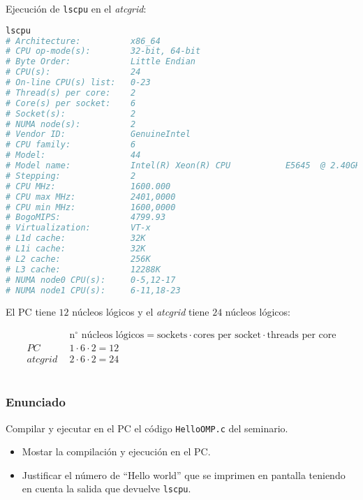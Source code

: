 \pagebreak

Ejecución de \texttt{lscpu} en el \textit{atcgrid}:

\begin{lstlisting}[language=sh]
lscpu
# Architecture:          x86_64
# CPU op-mode(s):        32-bit, 64-bit
# Byte Order:            Little Endian
# CPU(s):                24
# On-line CPU(s) list:   0-23
# Thread(s) per core:    2
# Core(s) per socket:    6
# Socket(s):             2
# NUMA node(s):          2
# Vendor ID:             GenuineIntel
# CPU family:            6
# Model:                 44
# Model name:            Intel(R) Xeon(R) CPU           E5645  @ 2.40GHz
# Stepping:              2
# CPU MHz:               1600.000
# CPU max MHz:           2401,0000
# CPU min MHz:           1600,0000
# BogoMIPS:              4799.93
# Virtualization:        VT-x
# L1d cache:             32K
# L1i cache:             32K
# L2 cache:              256K
# L3 cache:              12288K
# NUMA node0 CPU(s):     0-5,12-17
# NUMA node1 CPU(s):     6-11,18-23
\end{lstlisting}

El PC tiene $12$ núcleos lógicos y el \textit{atcgrid} tiene $24$ núcleos lógicos:

\[\begin{split}
           & \text{n$^\circ$ núcleos lógicos}=\text{sockets}\cdot\text{cores per socket}\cdot\text{threads per core}\\
PC\ \      & 1\cdot6\cdot2=12 \\
\textit{atcgrid}\ \ & 2\cdot6\cdot2=24
\end{split}\]

\section{}\label{ej1-2}

\subsubsection{Enunciado}

Compilar y ejecutar en el PC el código \texttt{HelloOMP.c} del seminario.

\begin{itemize}
	\item Mostar la compilación y ejecución en el PC\@.
	\item Justificar el número de ``Hello world'' que se imprimen en pantalla teniendo en cuenta la salida que devuelve \texttt{lscpu}.
\end{itemize}

